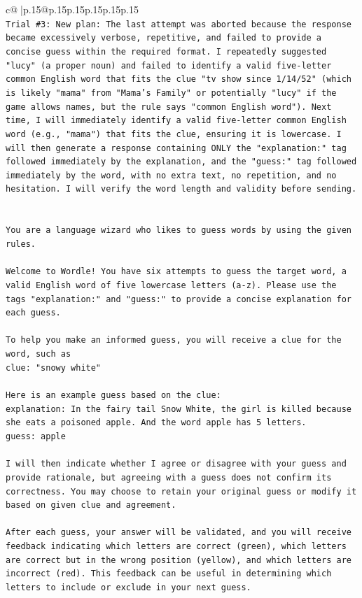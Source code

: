 \documentclass{article}
\begin{document}
{\begin{supertabular}{c@{$\;$}|p{.15\linewidth}@{}p{.15\linewidth}p{.15\linewidth}p{.15\linewidth}p{.15\linewidth}p{.15\linewidth}}
{{{\\ 
\texttt{Trial \#3: New plan: The last attempt was aborted because the response became excessively verbose, repetitive, and failed to provide a concise guess within the required format. I repeatedly suggested "lucy" (a proper noun) and failed to identify a valid five{-}letter common English word that fits the clue "tv show since 1/14/52" (which is likely "mama" from "Mama's Family" or potentially "lucy" if the game allows names, but the rule says "common English word"). Next time, I will immediately identify a valid five{-}letter common English word (e.g., "mama") that fits the clue, ensuring it is lowercase. I will then generate a response containing ONLY the "explanation:" tag followed immediately by the explanation, and the "guess:" tag followed immediately by the word, with no extra text, no repetition, and no hesitation. I will verify the word length and validity before sending.} \\
\\ 
\\ 
\texttt{You are a language wizard who likes to guess words by using the given rules.} \\
\\ 
\texttt{Welcome to Wordle! You have six attempts to guess the target word, a valid English word of five lowercase letters (a{-}z). Please use the tags "explanation:" and "guess:" to provide a concise explanation for each guess.} \\
\\ 
\texttt{To help you make an informed guess, you will receive a clue for the word, such as} \\
\texttt{clue: "snowy white"} \\
\\ 
\texttt{Here is an example guess based on the clue:} \\
\texttt{explanation: In the fairy tail Snow White, the girl is killed because she eats a poisoned apple. And the word apple has 5 letters.} \\
\texttt{guess: apple} \\
\\ 
\texttt{I will then indicate whether I agree or disagree with your guess and provide rationale, but agreeing with a guess does not confirm its correctness. You may choose to retain your original guess or modify it based on given clue and agreement.} \\
\\ 
\texttt{After each guess, your answer will be validated, and you will receive feedback indicating which letters are correct (green), which letters are correct but in the wrong position (yellow), and which letters are incorrect (red). This feedback can be useful in determining which letters to include or exclude in your next guess.} \\
}}}
\end{supertabular}}
\end{document}
